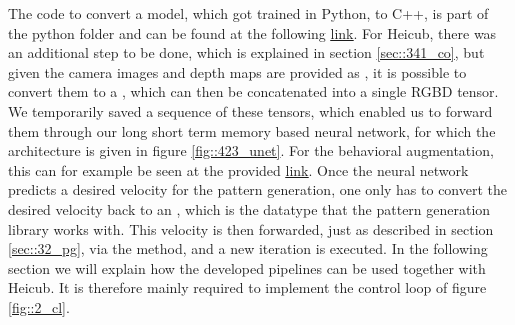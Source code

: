 The code to convert a model, which got trained in Python, to C++, is part of the python folder and can be found at the following \href{https://github.com/mhubii/nmpc_pattern_generator/blob/master/libs/learning/python/python_to_cpp.py}{\underline{link}}. For Heicub, there was an additional step to be done, which is explained in section \ref{sec::341_co}, but given the camera images and depth maps are provided as , it is possible to convert them to a , which can then be concatenated into a single RGBD tensor. We temporarily saved a sequence of these tensors, which enabled us to forward them through our long short term memory based neural network, for which the architecture is given in figure \ref{fig::423_unet}. For the behavioral augmentation, this can for example be seen at the provided \href{https://github.com/mhubii/nmpc_pattern_generator/blob/719fde0bb73925923de85cbf379c5523e075dfeb/src/behavioural_augmentation_real_robot_external_data.cpp#L625}{\underline{link}}. Once the neural network predicts a desired velocity for the pattern generation, one only has to convert the desired velocity back to an , which is the datatype that the pattern generation library works with. This velocity is then forwarded, just as described in section \ref{sec::32_pg}, via the  method, and a new iteration is executed. In the following section we will explain how the developed pipelines can be used together with Heicub. It is therefore mainly required to implement the control loop of figure \ref{fig::2_cl}. 